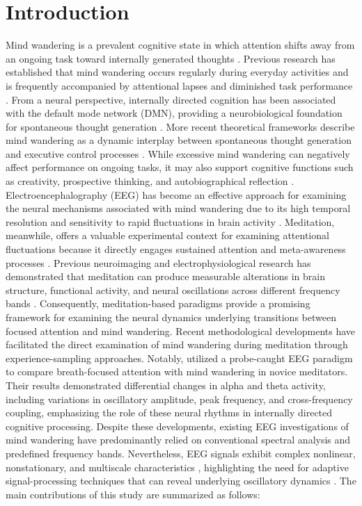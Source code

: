 \documentclass[conference]{IEEEtran}
\begin{document}
\section{Introduction}
Mind wandering is a prevalent cognitive state in which attention shifts away from an ongoing task toward internally generated thoughts \cite{smallwood2013restless}. Previous research has established that mind wandering occurs regularly during everyday activities and is frequently accompanied by attentional lapses and diminished task performance \cite{killingsworth2010wandering}. From a neural perspective, internally directed cognition has been associated with the default mode network (DMN), providing a neurobiological foundation for spontaneous thought generation \cite{raichle2001default}. More recent theoretical frameworks describe mind wandering as a dynamic interplay between spontaneous thought generation and executive control processes \cite{christoff2016mind}. While excessive mind wandering can negatively affect performance on ongoing tasks, it may also support cognitive functions such as creativity, prospective thinking, and autobiographical reflection \cite{shelat2026costs}.
Electroencephalography (EEG) has become an effective approach for examining the neural mechanisms associated with mind wandering due to its high temporal resolution and sensitivity to rapid fluctuations in brain activity \cite{KAM2022119372}. Meditation, meanwhile, offers a valuable experimental context for examining attentional fluctuations because it directly engages sustained attention and meta-awareness processes \cite{lutz2008attention,tang2015neuroscience}. Previous neuroimaging and electrophysiological research has demonstrated that meditation can produce measurable alterations in brain structure, functional activity, and neural oscillations across different frequency bands \cite{fox2014meditation,cahn2013meditation,lee2018review}. Consequently, meditation-based paradigms provide a promising framework for examining the neural dynamics underlying transitions between focused attention and mind wandering. 
Recent methodological developments have facilitated the direct examination of mind wandering during meditation through experience-sampling approaches. Notably, \cite{rodlarios} utilized a probe-caught EEG paradigm to compare breath-focused attention with mind wandering in novice meditators. Their results demonstrated differential changes in alpha and theta activity, including variations in oscillatory amplitude, peak frequency, and cross-frequency coupling, emphasizing the role of these neural rhythms in internally directed cognitive processing.
Despite these developments, existing EEG investigations of mind wandering have predominantly relied on conventional spectral analysis and predefined frequency bands. Nevertheless, EEG signals exhibit complex nonlinear, nonstationary, and multiscale characteristics \cite{cohen2014analyzing}, highlighting the need for adaptive signal-processing techniques that can reveal underlying oscillatory dynamics . 
The main contributions of this study are summarized as follows:
\end{document}
